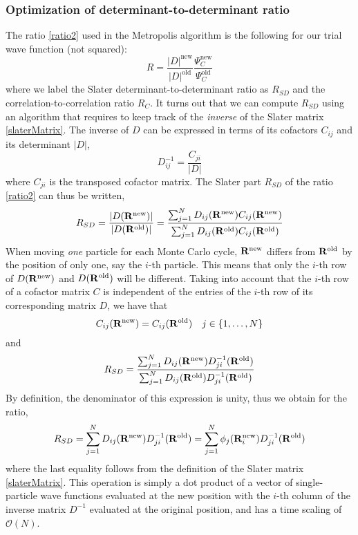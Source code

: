 \documentclass[english, a4paper]{article}
\begin{document}
\subsubsection{Optimization of determinant-to-determinant ratio}
The ratio \eqref{ratio2} used in the Metropolis algorithm is the following 
for our trial wave function (not squared):
\begin{equation}
 R = \frac{|D|^{\textrm{new}}}{|D|^{\textrm{old}}}
 \frac{\Psi_C^{\textrm{new}}}{\Psi_C^{\textrm{old}}}
\end{equation}
where we label the Slater determinant-to-determinant ratio as $R_{SD}$ and the correlation-to-correlation
ratio $R_C$.
It turns out that we can compute $R_{SD}$ using an algorithm that requires to keep track of the \textit{inverse}
of the Slater matrix \eqref{slaterMatrix}. The inverse of $D$ can be expressed in terms of its cofactors $C_{ij}$ and its
determinant $|D|$,
\begin{equation}
 D_{ij}^{-1} = \frac{C_{ji}}{|D|}
\end{equation}
where $C_{ji}$ is the transposed cofactor matrix. 
The Slater part $R_{SD}$ of the ratio \eqref{ratio2} can thus be written,
\begin{equation}
 R_{SD} = \frac{|D({\bf R}^{\textrm{new}})|}{|D({\bf R}^{\textrm{old}})|}
  = \frac{\sum_{j=1}^N D_{ij}({\bf R}^{\textrm{new}}) C_{ij}({\bf R}^{\textrm{new}})}
  {\sum_{j=1}^N D_{ij}({\bf R}^{\textrm{old}}) C_{ij}({\bf R}^{\textrm{old}})}
\end{equation}
When moving \textit{one} particle for each Monte Carlo cycle, ${\bf R}^{\textrm{new}}$ differs from 
${\bf R}^{\textrm{old}}$ by the position of only one, say the $i$-th particle. This means that
only the $i$-th row of $D({\bf R}^{\textrm{new}})$
and $D({\bf R}^{\textrm{old}})$ will be different. Taking into account that the $i$-th row of a cofactor matrix
$C$ is independent of the entries of the $i$-th row of its corresponding matrix $D$, we have that
\begin{equation}
 C_{ij}({\bf R}^{\textrm{new}}) = C_{ij}({\bf R}^{\textrm{old}}) \quad j \in \{1,\dots,N\}
\end{equation}
and
\begin{equation}
 R_{SD} = \frac{\sum_{j=1}^N D_{ij}({\bf R}^{\textrm{new}}) D_{ji}^{-1}({\bf R}^{\textrm{old}})}
  {\sum_{j=1}^N D_{ij}({\bf R}^{\textrm{old}}) D_{ji}^{-1}({\bf R}^{\textrm{old}})}
\end{equation}
By definition, the denominator of this expression is unity, thus we obtain for the ratio,
\begin{equation}
 R_{SD} = \sum_{j=1}^N D_{ij}({\bf R}^{\textrm{new}}) D_{ji}^{-1}({\bf R}^{\textrm{old}})
        = \sum_{j=1}^N \phi_j({\bf R}_i^{\textrm{new}}) D_{ji}^{-1}({\bf R}^{\textrm{old}})
        \label{slaterRatio}
\end{equation}
where the last equality follows from the definition of the Slater matrix \eqref{slaterMatrix}. 
This operation is simply a dot product of a vector of single-particle wave functions evaluated
at the new position with the $i$-th column of the inverse matrix $D^{-1}$ evaluated at the original position,
and has a time scaling of $\mathcal{O}(N)$.\\
\end{document}
